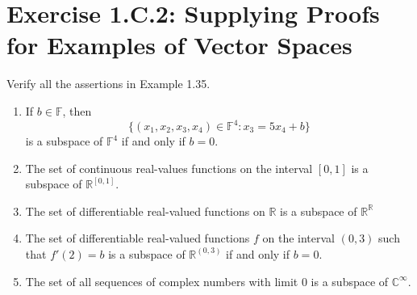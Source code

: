 \section{Exercise 1.C.2: Supplying Proofs for Examples of Vector Spaces}
Verify all the assertions in Example 1.35.
\begin{enumerate}[label=(\alph*)]
\item If $b\in\mathbb{F}$, then
\[
\{(x_1,x_2,x_3,x_4)\in\mathbb{F}^4: x_3=5x_4+b\}
\]
is a subspace of $\mathbb{F}^4$ if and only if $b=0$.
\item The set of continuous real-values functions on the interval $[0,1]$ is a subspace of $\mathbb{R}^{[0,1]}$.
\item The set of differentiable real-valued functions on $\mathbb{R}$ is a subspace of $\mathbb{R}^\mathbb{R}$
\item The set of differentiable real-valued functions $f$ on the interval $(0,3)$ such that $f'(2)=b$ is a subspace of $\mathbb{R}^{(0,3)}$ if and only if $b=0$.
\item The set of all sequences of complex numbers with limit $0$ is a subspace of $\mathbb{C}^\infty$.
\end{enumerate}
